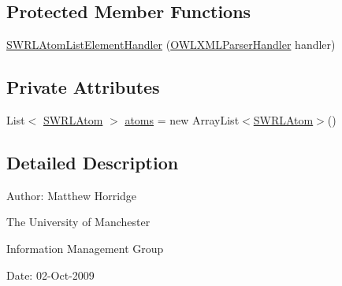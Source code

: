 \subsection*{Protected Member Functions}
\begin{DoxyCompactItemize}
\item 
\hyperlink{classorg_1_1coode_1_1owlapi_1_1owlxmlparser_1_1_s_w_r_l_atom_list_element_handler_a3a0ff777d2d1bd432a19dfb51229195f}{S\-W\-R\-L\-Atom\-List\-Element\-Handler} (\hyperlink{classorg_1_1coode_1_1owlapi_1_1owlxmlparser_1_1_o_w_l_x_m_l_parser_handler}{O\-W\-L\-X\-M\-L\-Parser\-Handler} handler)
\end{DoxyCompactItemize}
\subsection*{Private Attributes}
\begin{DoxyCompactItemize}
\item 
List$<$ \hyperlink{interfaceorg_1_1semanticweb_1_1owlapi_1_1model_1_1_s_w_r_l_atom}{S\-W\-R\-L\-Atom} $>$ \hyperlink{classorg_1_1coode_1_1owlapi_1_1owlxmlparser_1_1_s_w_r_l_atom_list_element_handler_a6e86cc6108e6a2e38e9764717283e93e}{atoms} = new Array\-List$<$\hyperlink{interfaceorg_1_1semanticweb_1_1owlapi_1_1model_1_1_s_w_r_l_atom}{S\-W\-R\-L\-Atom}$>$()
\end{DoxyCompactItemize}


\subsection{Detailed Description}
Author\-: Matthew Horridge\par
 The University of Manchester\par
 Information Management Group\par
 Date\-: 02-\/\-Oct-\/2009 


